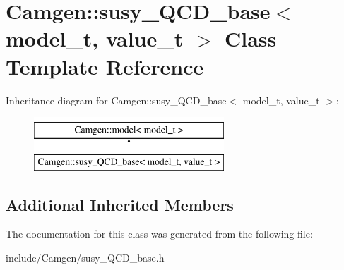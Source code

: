 \hypertarget{a00529}{}\section{Camgen\+:\+:susy\+\_\+\+Q\+C\+D\+\_\+base$<$ model\+\_\+t, value\+\_\+t $>$ Class Template Reference}
\label{a00529}
Inheritance diagram for Camgen\+:\+:susy\+\_\+\+Q\+C\+D\+\_\+base$<$ model\+\_\+t, value\+\_\+t $>$\+:\begin{figure}[H]
\begin{center}
\leavevmode
\includegraphics[height=2.000000cm]{a00529}
\end{center}
\end{figure}
\subsection*{Additional Inherited Members}


The documentation for this class was generated from the following file\+:\begin{DoxyCompactItemize}
\item 
include/\+Camgen/susy\+\_\+\+Q\+C\+D\+\_\+base.\+h\end{DoxyCompactItemize}
